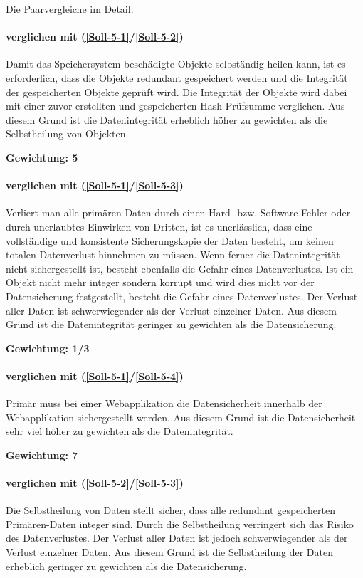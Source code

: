Die Paarvergleiche im Detail:


\paragraph*{ verglichen mit  (\ref{Soll-5-1}/\ref{Soll-5-2})}
Damit das Speichersystem beschädigte Objekte selbständig heilen kann, ist es erforderlich, dass die Objekte redundant gespeichert werden und die Integrität der gespeicherten Objekte geprüft wird. Die Integrität der Objekte wird dabei mit einer zuvor erstellten und gespeicherten Hash-Prüfsumme verglichen. Aus diesem Grund ist die Datenintegrität erheblich höher zu gewichten als die Selbstheilung von Objekten.

\textbf{Gewichtung: 5}

\paragraph*{ verglichen mit  (\ref{Soll-5-1}/\ref{Soll-5-3})}
Verliert man alle primären Daten durch einen Hard- bzw. Software Fehler oder durch unerlaubtes Einwirken von Dritten, ist es unerlässlich, dass eine vollständige und konsistente Sicherungskopie der Daten besteht, um keinen totalen Datenverlust hinnehmen zu müssen.
Wenn ferner die Datenintegrität nicht sichergestellt ist, besteht ebenfalls die Gefahr eines Datenverlustes. Ist ein Objekt nicht mehr integer sondern korrupt und wird dies nicht vor der Datensicherung festgestellt, besteht die Gefahr eines Datenverlustes.
Der Verlust aller Daten ist schwerwiegender als der Verlust einzelner Daten.
Aus diesem Grund ist die Datenintegrität geringer zu gewichten als die Datensicherung.

\textbf{Gewichtung: 1/3}

\paragraph*{ verglichen mit  (\ref{Soll-5-1}/\ref{Soll-5-4})}
Primär muss bei einer Webapplikation die Datensicherheit innerhalb der Webapplikation sichergestellt werden. Aus diesem Grund ist die Datensicherheit sehr viel höher zu gewichten als die Datenintegrität.

\textbf{Gewichtung: 7}

\paragraph*{ verglichen mit  (\ref{Soll-5-2}/\ref{Soll-5-3})}
Die Selbstheilung von Daten stellt sicher, dass alle redundant gespeicherten Primären-Daten integer sind. Durch die Selbstheilung verringert sich das Risiko des Datenverlustes. 
Der Verlust aller Daten ist jedoch schwerwiegender als der Verlust einzelner Daten.
Aus diesem Grund ist die Selbstheilung der Daten erheblich geringer zu gewichten als die Datensicherung.

